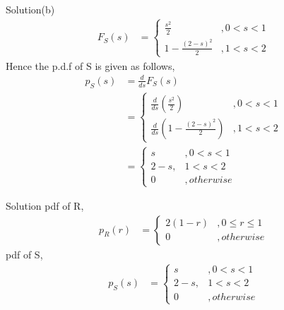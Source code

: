 \documentclass{beamer}
\theoremstyle{remark}
\numberwithin{equation}{subsection}
\begin{document}
\begin{frame}{Solution(b)}
    \begin{align}
        F_S(s) &= \begin{cases} \frac{s^2}{2} &, 0<s<1 \\
        1-\frac{(2-s)^2}{2} &, 1<s<2 \end{cases}
    \end{align}
    Hence the p.d.f of S is given as follows,
    \begin{align}
        p_S(s) &= \frac{d}{ds} F_S(s) \\
        &= \begin{cases} \frac{d}{ds}(\frac{s^2}{2}) &, 0<s<1 \\
        \frac{d}{ds}(1-\frac{(2-s)^2}{2}) &, 1<s<2 \end{cases} \\
        &= \begin{cases} s &, 0<s<1 \\
        2-s, &1<s<2\\
        0 &, otherwise\end{cases}
    \end{align}
\end{frame}

\begin{frame}{Solution}
    pdf of R,
    \begin{align}
        p_R(r) &= \begin{cases} 2(1-r) &, 0 \leq r \leq 1 \\
       0 &, otherwise\end{cases}
    \end{align}
    pdf of S, 
    \begin{align}
        p_S(s)&= \begin{cases} s &, 0<s<1 \\
        2-s, &1<s<2\\
        0 &, otherwise\end{cases}
    \end{align}
\end{frame}
\end{document}
